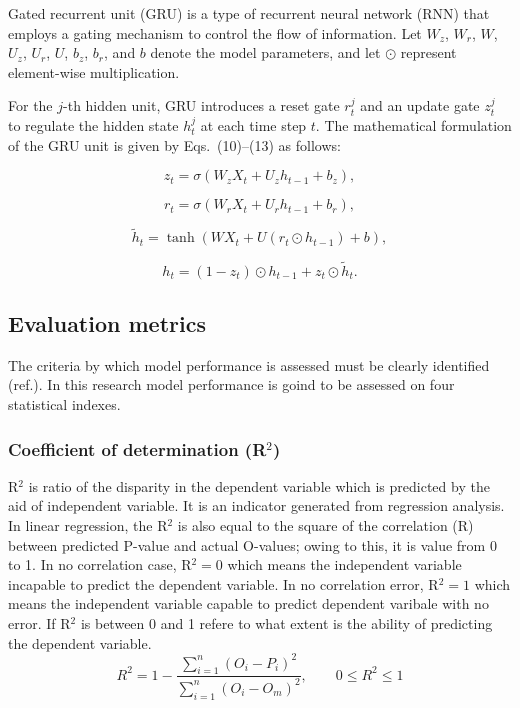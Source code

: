 \documentclass[pdflatex,sn-mathphys-num]{sn-jnl}%
\theoremstyle{thmstyleone}%
\theoremstyle{thmstyletwo}%
\theoremstyle{thmstylethree}%
\begin{document}
Gated recurrent unit (GRU) is a type of recurrent neural network (RNN) that employs a gating mechanism to control the flow of information.  Let $W_z$, $W_r$, $W$, $U_z$, $U_r$, $U$, $b_z$, $b_r$, and $b$ denote the model parameters, and let $\odot$ represent element-wise multiplication. 

For the $j$-th hidden unit, GRU introduces a reset gate $r_t^j$ and an update gate $z_t^j$  to regulate the hidden state $h_t^j$ at each time step $t$.  The mathematical formulation of the GRU unit is given by Eqs.~(10)--(13) as follows:

\begin{equation}
z_t = \sigma \left( W_z X_t + U_z h_{t-1} + b_z \right),
\tag{10}
\end{equation}

\begin{equation}
r_t = \sigma \left( W_r X_t + U_r h_{t-1} + b_r \right),
\tag{11}
\end{equation}

\begin{equation}
\tilde{h}_t = \tanh \left( W X_t + U \left( r_t \odot h_{t-1} \right) + b \right),
\tag{12}
\end{equation}

\begin{equation}
h_t = \left( 1 - z_t \right) \odot h_{t-1} + z_t \odot \tilde{h}_t .
\tag{13}
\end{equation}

\subsection{Evaluation metrics}
The criteria by which model performance is assessed must be clearly identified (ref.). In this research model performance is goind to be assessed on four statistical indexes.

\subsubsection{Coefficient of determination (R$^{2}$)}
R$^{2}$ is ratio of the disparity in the dependent variable which is predicted by the aid of independent variable. It is an indicator generated from regression analysis. In linear regression, the R$^{2}$ is also equal to the square of the correlation (R) between predicted P-value and actual O-values; owing to this, it is value from 0 to 1. In no correlation case, R$^{2}=0$ which means the independent variable incapable to predict the dependent variable. In no correlation error, R$^{2}=1$ which means the independent variable capable to predict dependent varibale with no error. If R$^{2}$ is between 0 and 1 refere to what extent is the ability of predicting the dependent variable.
\begin{equation}
R^2 = 1 - 
\frac{\sum_{i=1}^{n}(O_i - P_i)^2}
{\sum_{i=1}^{n}(O_i - O_m)^2},
\qquad 0 \leq R^2 \leq 1
\label{eq:r_square}
\end{equation}
\end{document}
